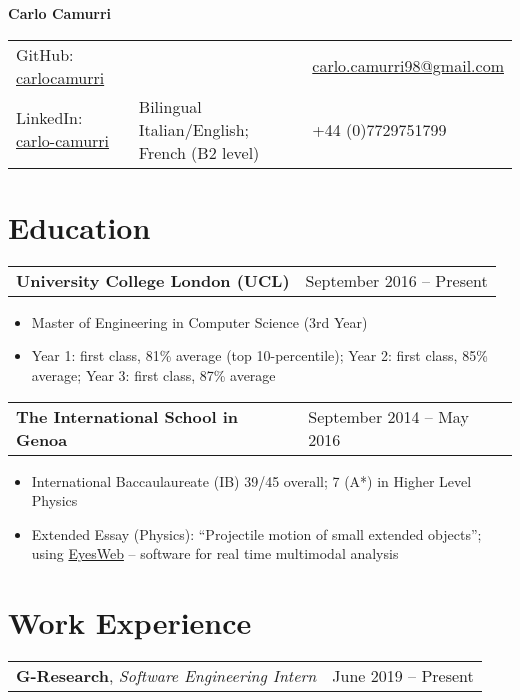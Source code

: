 \documentclass[a4paper, 10pt]{article}
\makeatletter
\newenvironment{details}{\addvspace{3pt} \begin{tabu} to \textwidth {@{}X[2l] X[1r]@{}}}{\end{tabu}}
\newenvironment{workdetails}{\addvspace{3pt} \begin{tabu} to \textwidth {@{}X[4l] X[1r]@{}}}{\end{tabu}}
\newenvironment{personaldetails}{\begin{tabu} to \textwidth {@{}X[1l] X[1.5c] X[1r]@{}}}{\end{tabu}}
\newcommand{\company}[1]{\normalsize \textbf{#1}}
\newcommand{\timerange}[1]{\normalsize #1}
\newcommand{\position}[1]{\normalsize \textit{#1}}
\newenvironment{info}{\small \begin{itemize}[
    noitemsep,
    topsep=-3pt,
    leftmargin=*,
    align=parleft
]}{\end{itemize}}
\makeatother
\begin{document}
    
    \centerline{\Large \bfseries Carlo Camurri}
    \begin{personaldetails}
        GitHub: \href{https://github.com/carlocamurri}{carlocamurri} & & \href{mailto:carlo.camurri98@gmail.com}{carlo.camurri98@gmail.com} \\
        LinkedIn: \href{https://www.linkedin.com/in/carlo-camurri/}{carlo-camurri} & Bilingual Italian/English; French (B2 level) & +44 (0)7729751799
    \end{personaldetails}

    \section*{Education}

        \begin{details} 
            \company{University College London (UCL)} & \timerange{September 2016 -- Present}
        \end{details}

        \begin{info}
            \item Master of Engineering in Computer Science (3rd Year)
            \item Year 1: first class, 81\% average (top 10-percentile); Year 2: first class, 85\% average; Year 3: first class, 87\% average
        \end{info}

        \begin{details}
            \company{The International School in Genoa} & \timerange{September 2014 -- May 2016}
        \end{details}

        \begin{info}
            \item International Baccaulaureate (IB) 39/45 overall; 7 (A*) in Higher Level Physics
            \item Extended Essay (Physics): ``Projectile motion of small extended objects''; using \href{http://www.infomus.org/eyesweb_ita.php}{EyesWeb} -- software for real time multimodal analysis
        \end{info}

    \section*{Work Experience}
    
        \begin{workdetails}
            \company{G-Research}, \position{Software Engineering Intern} & \timerange{June 2019 -- Present}
        \end{workdetails}
    
\end{document}
